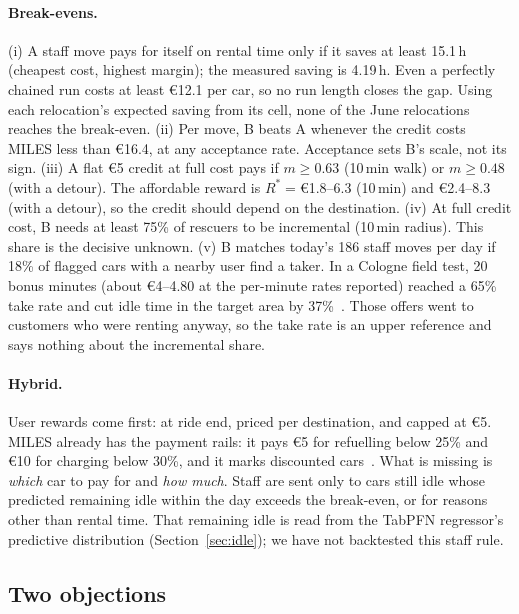 \documentclass[11pt,a4paper]{article}
\newcommand{\eur}[1]{\euro{}#1}
\begin{document}
\paragraph{Break-evens.}
(i) A staff move pays for itself on rental time only if it saves at least 15.1\,h (cheapest cost, highest margin); the measured saving is 4.19\,h. Even a perfectly chained run costs at least \eur{12.1} per car, so no run length closes the gap. Using each relocation's expected saving from its cell, none of the June relocations reaches the break-even. (ii) Per move, B beats A whenever the credit costs MILES less than \eur{16.4}, at any acceptance rate. Acceptance sets B's scale, not its sign. (iii) A flat \eur{5} credit at full cost pays if $m\ge0.63$ (10\,min walk) or $m\ge0.48$ (with a detour). The affordable reward is $R^\ast={}$\eur{1.8}--6.3 (10\,min) and \eur{2.4}--8.3 (with a detour), so the credit should depend on the destination. (iv) At full credit cost, B needs at least 75\% of rescuers to be incremental (10\,min radius). This share is the decisive unknown. (v) B matches today's 186 staff moves per day if 18\% of flagged cars with a nearby user find a taker. In a Cologne field test, 20 bonus minutes (about \eur{4}--4.80 at the per-minute rates reported) reached a 65\% take rate and cut idle time in the target area by 37\%~\citep{lippoldt2019cologne}. Those offers went to customers who were renting anyway, so the take rate is an upper reference and says nothing about the incremental share.

\paragraph{Hybrid.} User rewards come first: at ride end, priced per destination, and capped at \eur{5}. MILES already has the payment rails: it pays \eur{5} for refuelling below 25\% and \eur{10} for charging below 30\%, and it marks discounted cars~\citep{milescredit2026}. What is missing is \emph{which} car to pay for and \emph{how much}. Staff are sent only to cars still idle whose predicted remaining idle within the day exceeds the break-even, or for reasons other than rental time. That remaining idle is read from the TabPFN regressor's predictive distribution (Section~\ref{sec:idle}); we have not backtested this staff rule.

\subsection{Two objections}\label{sec:objections}
\end{document}
